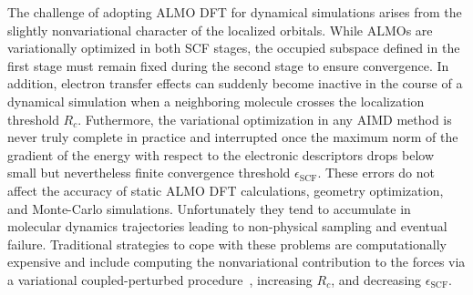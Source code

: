 \documentclass[aps,prl,reprint,amsmath,amssymb]{revtex4-1}
\begin{document}

The challenge of adopting ALMO DFT for dynamical simulations arises from the slightly nonvariational character of the localized orbitals. While ALMOs are variationally optimized in both SCF stages, the occupied subspace defined in the first stage must remain fixed during the second stage to ensure convergence. In addition, electron transfer effects can suddenly become inactive in the course of a dynamical simulation when a neighboring molecule crosses the localization threshold $R_{c}$. Futhermore, the variational optimization in any AIMD method is never truly complete in practice
and interrupted once the maximum norm of the gradient of the energy with respect to the electronic descriptors drops below small but nevertheless finite convergence threshold $\epsilon_{\text{SCF}}$. These errors do not affect the accuracy of static ALMO DFT calculations, geometry optimization, and Monte-Carlo simulations. Unfortunately they tend to accumulate in molecular dynamics trajectories leading to non-physical sampling and eventual failure. 
Traditional strategies to cope with these problems are computationally expensive and include computing the nonvariational contribution to the forces via a variational coupled-perturbed procedure~\cite{Kussmann2013,Benoit2001}, increasing $R_c$, and decreasing $\epsilon_{\text{SCF}}$. 
\end{document}
